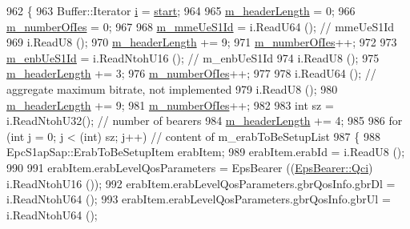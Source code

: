 \begin{DoxyCode}
962 \{
963   Buffer::Iterator \hyperlink{bernuolliDistribution_8m_a6f6ccfcf58b31cb6412107d9d5281426}{i} = \hyperlink{namespacevisualizer_1_1core_a2a35e5d8a34af358b508dac8635754e0}{start};
964 
965   \hyperlink{classns3_1_1EpcS1APInitialContextSetupRequestHeader_a97a7b59b57698f07875de44c28a16022}{m\_headerLength} = 0;
966   \hyperlink{classns3_1_1EpcS1APInitialContextSetupRequestHeader_a012f5d047e0878426f6ef74152529fed}{m\_numberOfIes} = 0;
967 
968   \hyperlink{classns3_1_1EpcS1APInitialContextSetupRequestHeader_a6a9fdc8227eeed2cd24dfda32418c260}{m\_mmeUeS1Id} = i.ReadU64 ();         \textcolor{comment}{// mmeUeS1Id}
969   i.ReadU8 ();                 
970   \hyperlink{classns3_1_1EpcS1APInitialContextSetupRequestHeader_a97a7b59b57698f07875de44c28a16022}{m\_headerLength} += 9;
971   \hyperlink{classns3_1_1EpcS1APInitialContextSetupRequestHeader_a012f5d047e0878426f6ef74152529fed}{m\_numberOfIes}++;
972 
973   \hyperlink{classns3_1_1EpcS1APInitialContextSetupRequestHeader_a37f5cdab600c58a26abb754ad2593898}{m\_enbUeS1Id} = i.ReadNtohU16 ();     \textcolor{comment}{// m\_enbUeS1Id}
974   i.ReadU8 ();           
975   \hyperlink{classns3_1_1EpcS1APInitialContextSetupRequestHeader_a97a7b59b57698f07875de44c28a16022}{m\_headerLength} += 3;
976   \hyperlink{classns3_1_1EpcS1APInitialContextSetupRequestHeader_a012f5d047e0878426f6ef74152529fed}{m\_numberOfIes}++;
977 
978   i.ReadU64 ();               \textcolor{comment}{// aggregate maximum bitrate, not implemented}
979   i.ReadU8 ();
980   \hyperlink{classns3_1_1EpcS1APInitialContextSetupRequestHeader_a97a7b59b57698f07875de44c28a16022}{m\_headerLength} += 9;
981   \hyperlink{classns3_1_1EpcS1APInitialContextSetupRequestHeader_a012f5d047e0878426f6ef74152529fed}{m\_numberOfIes}++;
982 
983   \textcolor{keywordtype}{int} sz = i.ReadNtohU32(); \textcolor{comment}{// number of bearers}
984   \hyperlink{classns3_1_1EpcS1APInitialContextSetupRequestHeader_a97a7b59b57698f07875de44c28a16022}{m\_headerLength} += 4;
985 
986   \textcolor{keywordflow}{for} (\textcolor{keywordtype}{int} j = 0; j < (int) sz; j++) \textcolor{comment}{// content of m\_erabToBeSetupList}
987   \{
988     EpcS1apSap::ErabToBeSetupItem erabItem;
989     erabItem.erabId = i.ReadU8 ();
990  
991     erabItem.erabLevelQosParameters = EpsBearer ((\hyperlink{structns3_1_1EpsBearer_aecf0c67109c5eb4ec0b07226fff5885e}{EpsBearer::Qci}) i.ReadNtohU16 ());
992     erabItem.erabLevelQosParameters.gbrQosInfo.gbrDl = i.ReadNtohU64 ();
993     erabItem.erabLevelQosParameters.gbrQosInfo.gbrUl = i.ReadNtohU64 ();

\end{DoxyCode}
